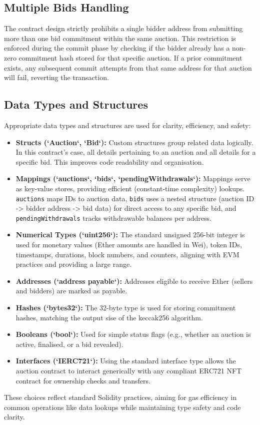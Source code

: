 \documentclass[11pt, a4paper]{article}
\begin{document}
\subsection{Multiple Bids Handling}
The contract design strictly prohibits a single bidder address from submitting more than one bid commitment within the same auction. This restriction is enforced during the commit phase by checking if the bidder already has a non-zero commitment hash stored for that specific auction. If a prior commitment exists, any subsequent commit attempts from that same address for that auction will fail, reverting the transaction.

\subsection{Data Types and Structures}
Appropriate data types and structures are used for clarity, efficiency, and safety:
\begin{itemize}
    \item \textbf{Structs (`Auction`, `Bid`):} Custom structures group related data logically. In this contract's case, all details pertaining to an auction and all details for a specific bid. This improves code readability and organisation.
    \item \textbf{Mappings (`auctions`, `bids`, `pendingWithdrawals`):} Mappings serve as key-value stores, providing efficient (constant-time complexity) lookups. \texttt{auctions} maps IDs to auction data, \texttt{bids} uses a nested structure (auction ID -> bidder address -> bid data) for direct access to any specific bid, and \texttt{pendingWithdrawals} tracks withdrawable balances per address.
    \item \textbf{Numerical Types (`uint256`):} The standard unsigned 256-bit integer is used for monetary values (Ether amounts are handled in Wei), token IDs, timestamps, durations, block numbers, and counters, aligning with EVM practices and providing a large range.
    \item \textbf{Addresses (`address payable`):} Addresses eligible to receive Ether (sellers and bidders) are marked as payable.
    \item \textbf{Hashes (`bytes32`):} The 32-byte type is used for storing commitment hashes, matching the output sise of the keccak256 algorithm.
    \item \textbf{Booleans (`bool`):} Used for simple status flags (e.g., whether an auction is active, finalised, or a bid revealed).
    \item \textbf{Interfaces (`IERC721`):} Using the standard interface type allows the auction contract to interact generically with any compliant ERC721 NFT contract for ownership checks and transfers.
\end{itemize}
These choices reflect standard Solidity practices, aiming for gas efficiency in common operations like data lookups while maintaining type safety and code clarity.
\end{document}
